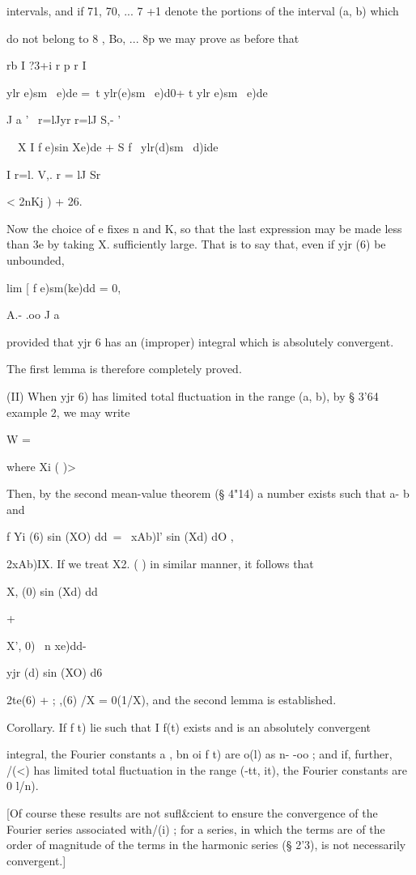 intervals, and if 71, 70, ... 7 +1 denote the portions of the interval
(a, b) which

do not belong to 8 , Bo, ... 8p we may prove as before that

rb I ?3+i r p r I

ylr e)sm \ e)de =\ t ylr(e)sm \ e)d0+ t ylr e)sm \ e)de\

J a ' \ r=lJyr r=lJ S,- '

 \ \ X I f e)sin Xe)de + S f \ ylr(d)sm \ d)ide

I r=l. V,. r = lJ Sr

< 2nKj ) + 26.

Now the choice of e fixes n and K, so that the last expression may be
made less than 3e by taking X. sufficiently large. That is to say
that, even if yjr (6) be unbounded,

lim [ f e)sm(ke)dd = 0,

A.- .oo J a

provided that yjr 6 has an (improper) integral which is absolutely
convergent.

The first lemma is therefore completely proved.

(II) When yjr 6) has limited total fluctuation in the range (a, b), by
§ 3'64 example 2, we may write

 W = %

where Xi ( )> %

Then, by the second mean-value theorem (§ 4"14) a number exists such
that a- b and

f Yi (6) sin (XO) dd\ = \ xAb)l' sin (Xd) dO ,

 2xAb)IX. If we treat X2. ( ) in similar manner, it follows that

X, (0) sin (Xd) dd

+

X', 0) \ n xe)dd-

yjr (d) sin (XO) d6

 2te(6) + ; ,(6) /X = 0(1/X), and the second lemma is established.

Corollary. If f t) lie such that I f(t) exists and is an absolutely
convergent

integral, the Fourier constants a , bn oi f t) are o(l) as n- -oo ;
and if, further, /(<) has limited total fluctuation in the range (-tt,
it), the Fourier constants are 0 l/n).

[Of course these results are not sufl\&cient to ensure the convergence
of the Fourier series associated with/(i) ; for a series, in which the
terms are of the order of magnitude of the terms in the harmonic
series (§ 2'3), is not necessarily convergent.]

